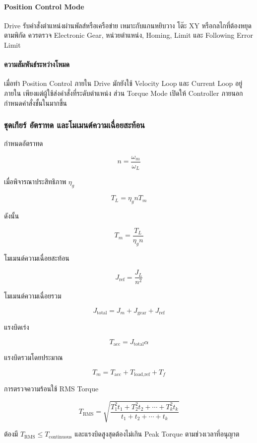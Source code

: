 \paragraph{Position Control Mode}

Drive รับคำสั่งตำแหน่งผ่านพัลส์หรือเครือข่าย เหมาะกับแกนหยิบวาง โต๊ะ XY หรือกลไกที่ต้องหยุดตามพิกัด ควรตรวจ Electronic Gear, หน่วยตำแหน่ง, Homing, Limit และ Following Error Limit

\paragraph{ความสัมพันธ์ระหว่างโหมด}

เมื่อทำ Position Control ภายใน Drive มักยังใช้ Velocity Loop และ Current Loop อยู่ภายใน เพียงแต่ผู้ใช้ส่งคำสั่งที่ระดับตำแหน่ง ส่วน Torque Mode เปิดให้ Controller ภายนอกกำหนดคำสั่งชั้นในมากขึ้น

\subsubsection{ชุดเกียร์ อัตราทด และโมเมนต์ความเฉื่อยสะท้อน}

กำหนดอัตราทด

\[
n=\frac{\omega_m}{\omega_L}
\]

เมื่อพิจารณาประสิทธิภาพ $\eta_g$

\[
T_L=\eta_g n T_m
\]

ดังนั้น

\[
T_m=\frac{T_L}{\eta_g n}
\]

โมเมนต์ความเฉื่อยสะท้อน

\[
J_{\text{ref}}=\frac{J_L}{n^2}
\]

โมเมนต์ความเฉื่อยรวม

\[
J_{\text{total}}=J_m+J_{\text{gear}}+J_{\text{ref}}
\]

แรงบิดเร่ง

\[
T_{\text{acc}}=J_{\text{total}}\alpha
\]

แรงบิดรวมโดยประมาณ

\[
T_m=T_{\text{acc}}+T_{\text{load,ref}}+T_f
\]

การตรวจความร้อนใช้ RMS Torque

\[
T_{\text{RMS}}
=
\sqrt{
\frac{
T_1^2t_1+T_2^2t_2+\cdots+T_k^2t_k
}{
t_1+t_2+\cdots+t_k
}
}
\]

ต้องมี $T_{\text{RMS}}\leq T_{\text{continuous}}$ และแรงบิดสูงสุดต้องไม่เกิน Peak Torque ตามช่วงเวลาที่อนุญาต

